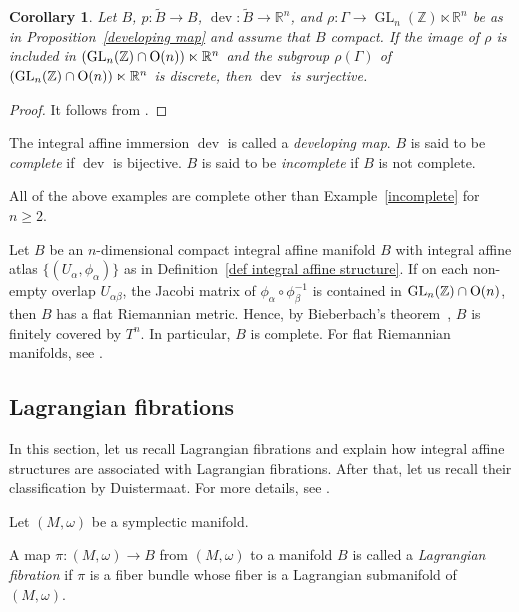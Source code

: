 \documentclass[10pt,a4paper]{amsart}
\numberwithin{equation}{section}
\newtheorem{Corollary}[Theorem]{Corollary}
\newcommand{\R}{\mathbb{R}}
\newcommand{\Z}{\mathbb{Z}}
\renewcommand{\tilde}{\widetilde}
\def\dev{\operatorname{dev}}
\def\GL{\operatorname{GL}}
\begin{document}
\begin{Corollary}
Let $B$, $p\colon \tilde B\to B$, $\dev\colon \tilde B\to \R^n$, and $\rho\colon \Gamma\to \GL_n(\Z)\ltimes \R^n$ be as in Proposition~{\rm\ref{developing map}} and assume that $B$ compact. If the image of $\rho$ is included in $(\GL_n(\Z)\cap {\rm O}(n))\ltimes \R^n$ and the subgroup $\rho(\Gamma )$ of $(\GL_n(\Z)\cap {\rm O}(n))\ltimes \R^n$ is discrete, then $\dev$ is surjective.
\end{Corollary}
\begin{proof}
It follows from \cite[Theorem~3.1.3]{Wolf}.
\end{proof}

\begin{Definition}
The integral affine immersion $\dev$ is called a \emph{developing map}. $B$ is said to be \emph{complete} if $\dev$ is bijective. $B$ is said to be \emph{incomplete} if $B$ is not complete.
\end{Definition}
\begin{Example}
All of the above examples are complete other than Example~\ref{incomplete} for $n\ge 2$.
\end{Example}

\begin{Example}
Let $B$ be an $n$-dimensional compact integral affine manifold $B$ with integral affine atlas $\{ (U_\alpha,\phi_\alpha)\}$ as in Definition~\ref{def integral affine structure}. If on each non-empty overlap $U_{\alpha\beta}$, the Jacobi matrix of $\phi_\alpha\circ \phi_\beta^{-1}$ is contained in $\GL_n(\Z)\cap {\rm O}(n)$, then $B$ has a flat Riemannian metric. Hence, by Bieberbach's theorem~\cite{Bie1, Bie2}, $B$ is finitely covered by $T^n$. In particular, $B$ is complete. For flat Riemannian manifolds, see \cite[Chapter~3]{Wolf}.
\end{Example}

\subsection{Lagrangian fibrations}\label{Lagrangian fibration}
In this section, let us recall Lagrangian fibrations and explain how integral affine structures are associated with Lagrangian fibrations. After that, let us recall their classification by Duistermaat. For more details, see \cite{Du,MR2587398,Y4}.

Let $(M,\omega)$ be a symplectic manifold.
\begin{Definition}
A map $\pi\colon (M,\omega)\to B$ from $(M,\omega)$ to a manifold $B$ is called a {\it Lagrangian fibration} if $\pi$ is a fiber bundle whose fiber is a Lagrangian submanifold of $(M,\omega)$.
\end{Definition}
\end{document}
